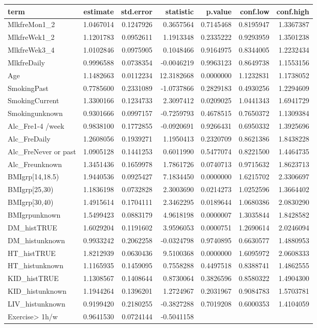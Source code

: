 \documentclass[]{article}
\begin{document}
\begin{longtable}[]{@{}lrrrrrr@{}}
\toprule
term & estimate & std.error & statistic & p.value & conf.low &
conf.high\tabularnewline
\midrule
\endhead
MlkfreMon1\_2 & 1.0467014 & 0.1247926 & 0.3657564 & 0.7145468 &
0.8195947 & 1.3367387\tabularnewline
MlkfreWek1\_2 & 1.1201783 & 0.0952611 & 1.1913348 & 0.2335222 &
0.9293959 & 1.3501238\tabularnewline
MlkfreWek3\_4 & 1.0102846 & 0.0975905 & 0.1048466 & 0.9164975 &
0.8344005 & 1.2232434\tabularnewline
MlkfreDaily & 0.9996588 & 0.0738354 & -0.0046219 & 0.9963123 & 0.8649738
& 1.1553156\tabularnewline
Age & 1.1482663 & 0.0112234 & 12.3182668 & 0.0000000 & 1.1232831 &
1.1738052\tabularnewline
SmokingPast & 0.7785600 & 0.2331089 & -1.0737866 & 0.2829183 & 0.4930256
& 1.2294609\tabularnewline
SmokingCurrent & 1.3300166 & 0.1234733 & 2.3097412 & 0.0209025 &
1.0441343 & 1.6941729\tabularnewline
Smokingunknown & 0.9301666 & 0.0997157 & -0.7259793 & 0.4678515 &
0.7650372 & 1.1309384\tabularnewline
Alc\_Fre1-4 /week & 0.9838100 & 0.1772855 & -0.0920691 & 0.9266431 &
0.6950332 & 1.3925696\tabularnewline
Alc\_FreDaily & 1.2608056 & 0.1939271 & 1.1950413 & 0.2320709 &
0.8621386 & 1.8438228\tabularnewline
Alc\_FreNever or past & 1.0905128 & 0.1441253 & 0.6011990 & 0.5477074 &
0.8221500 & 1.4464735\tabularnewline
Alc\_Freunknown & 1.3451436 & 0.1659978 & 1.7861726 & 0.0740713 &
0.9715632 & 1.8623713\tabularnewline
BMIgrp{[}14,18.5) & 1.9440536 & 0.0925427 & 7.1834450 & 0.0000000 &
1.6215702 & 2.3306697\tabularnewline
BMIgrp{[}25,30) & 1.1836198 & 0.0732828 & 2.3003690 & 0.0214273 &
1.0252596 & 1.3664402\tabularnewline
BMIgrp{[}30,40) & 1.4915614 & 0.1704111 & 2.3462295 & 0.0189644 &
1.0680386 & 2.0830290\tabularnewline
BMIgrpunknown & 1.5499423 & 0.0883179 & 4.9618198 & 0.0000007 &
1.3035844 & 1.8428582\tabularnewline
DM\_histTRUE & 1.6029204 & 0.1191602 & 3.9596053 & 0.0000751 & 1.2690614
& 2.0246094\tabularnewline
DM\_histunknown & 0.9933242 & 0.2062258 & -0.0324798 & 0.9740895 &
0.6630577 & 1.4880953\tabularnewline
HT\_histTRUE & 1.8212939 & 0.0630436 & 9.5100368 & 0.0000000 & 1.6095972
& 2.0608333\tabularnewline
HT\_histunknown & 1.1165935 & 0.1459095 & 0.7558288 & 0.4497518 &
0.8388741 & 1.4862555\tabularnewline
KID\_histTRUE & 1.1308567 & 0.1408644 & 0.8730064 & 0.3826596 &
0.8580322 & 1.4904300\tabularnewline
KID\_histunknown & 1.1944264 & 0.1396201 & 1.2724967 & 0.2031967 &
0.9084783 & 1.5703781\tabularnewline
LIV\_histunknown & 0.9199420 & 0.2180255 & -0.3827288 & 0.7019208 &
0.6000353 & 1.4104059\tabularnewline
Exercise\textgreater{} 1h/w & 0.9641530 & 0.0724144 & -0.5041158 &

\end{longtable}
\end{document}
